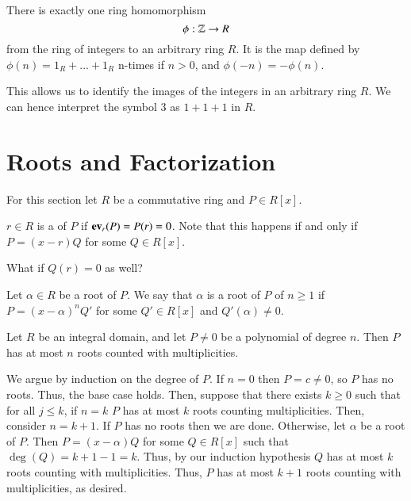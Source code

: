 \documentclass[12pt, a4paper, twoside, openright, titlepage]{book}
\begin{document}
\begin{prop}{}{}
        There is exactly one ring homomorphism \begin{equation}
                \phi:\mathbb Z\rightarrow R
        \end{equation}
        from the ring of integers to an arbitrary ring $R$. It is the map defined by $\phi(n) = 1_R+...+1_R$ n-times if $n > 0$, and $\phi(-n) = -\phi(n)$.
\end{prop}


\begin{rmk}{}{}
        This allows us to identify the images of the integers in an arbitrary ring $R$. We can hence interpret the symbol $3$ as $1+1+1$ in $R$.
\end{rmk}


\section{\textsection Roots and Factorization}

For this section let $R$ be a commutative ring and $P \in R[x]$.

\begin{defn}{}{}
    $r \in R$ is a  of $P$ if $\operatorname{\bf{ev}}_r(P) = P(r) = 0$. Note that this happens if and only if $P = (x-r)Q$ for some $Q \in R[x]$.
\end{defn}

\begin{qest}
    What if $Q(r) = 0$ as well?
\end{qest}

\begin{defn}{}{}
    Let $\alpha \in R$ be a root of $P$. We say that $\alpha$ is a root of $P$ of  $n \geq 1$ if $P = (x-\alpha)^nQ'$ for some $Q' \in R[x]$ and $Q'(\alpha) \neq 0$.
\end{defn}

\begin{prop}{}{}
    Let $R$ be an integral domain, and let $P \neq 0$ be a polynomial of degree $n$. Then $P$ has at most $n$ roots counted with multiplicities.
\end{prop}
\begin{proof*}{}{}
    We argue by induction on the degree of $P$. If $n = 0$ then $P = c \neq 0$, so $P$ has no roots. Thus, the base case holds. Then, suppose that there exists $k \geq 0$ such that for all $j \leq k$, if $n = k$ $P$ has at most $k$ roots counting multiplicities. Then, consider $n = k+1$. If $P$ has no roots then we are done. Otherwise, let $\alpha$ be a root of $P$. Then $P = (x-\alpha)Q$ for some $Q \in R[x]$ such that $\deg(Q) = k+1-1 = k$. Thus, by our induction hypothesis $Q$ has at most $k$ roots counting with multiplicities. Thus, $P$ has at most $k + 1$ roots counting with multiplicities, as desired.
\end{proof*}
\end{document}

